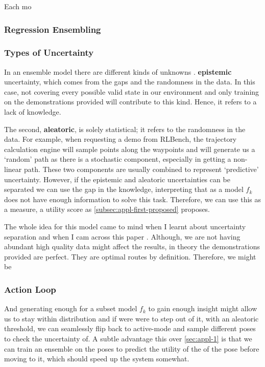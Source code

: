 Each mo

\subsubsection{Regression Ensembling}


\subsubsection{Types of Uncertainty}
In an ensemble model there are different kinds of unknowns \cite{Gal2016Uncertainty, H_llermeier_2021, valdenegrotoro2022deeperlookaleatoricepistemic}. \textbf{epistemic} uncertainty, which comes from the gaps and the randomness in the data. In this case, not covering every possible valid state in our environment and only training on the demonstrations provided will contribute to this kind. Hence, it refers to a lack of knowledge.

The second, \textbf{aleatoric}, is solely statistical; it refers to the randomness in the data. For example, when requesting a demo from RLBench, the trajectory calculation engine will sample points along the waypoints and will generate us a `random' path as there is a stochastic component, especially in getting a non-linear path. These two components are usually combined to represent `predictive' uncertainty. However, if the epistemic and aleatoric uncertainties can be separated we can use the gap in the knowledge, interpreting that as a model $f_k$ does not have enough information to solve this task. Therefore, we can use this as a measure, a utility score as \ref{subsec:appl-first-proposed} proposes.

The whole idea for this model came to mind when I learnt about uncertainty separation and when I cam across this paper \cite{ansari2024eqr}. Although, we are not having abundant high quality data might affect the results, in theory the demonstrations provided are perfect. They are optimal routes by definition. Therefore, we might be 


\subsubsection{Action Loop}
And generating enough for a subset model $f_k$ to gain enough insight might allow us to stay within distribution and if were were to step out of it, with an aleatoric threshold, we can seamlessly flip back to active-mode and sample different poses to check the uncertainty of. A subtle advantage this over \ref{sec:appl-1} is that we can train an ensemble on the poses to predict the utility of the of the pose before moving to it, which should speed up the system somewhat.


